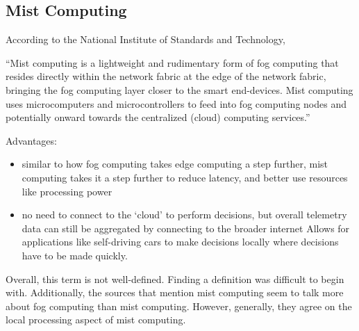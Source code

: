 \subsection{Mist Computing}
According to the National Institute of Standards and Technology,
\begin{displayquote}
  ``Mist computing is a lightweight and rudimentary form of fog computing that resides directly within
the network fabric at the edge of the network fabric, bringing the fog computing layer closer to
the smart end-devices. Mist computing uses microcomputers and microcontrollers to feed into fog
computing nodes and potentially onward towards the centralized (cloud) computing
services.''
\end{displayquote}

Advantages:
\begin{itemize}
  \item similar to how fog computing takes edge computing a step further, mist
    computing takes it a step further to reduce latency, and better use
    resources like processing power
  \item no need to connect to the `cloud' to perform decisions, but overall
    telemetry data can still be aggregated by connecting to the broader internet
    Allows for applications like self-driving cars to make decisions locally
    where decisions have to be made quickly. 
\end{itemize}

Overall, this term is not well-defined. Finding a definition was difficult to
begin with. Additionally, the sources that mention mist computing seem to talk
more about fog computing than mist computing. However, generally, they agree on
the local processing aspect of mist computing.
